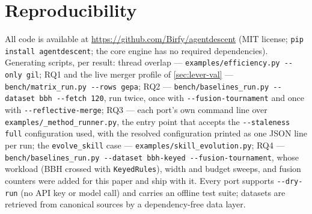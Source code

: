 \documentclass{article}
\newcommand{\code}[1]{\texttt{#1}}
\begin{document}
\section*{Reproducibility}
\label{sec:repro}
\sloppy
All code is available at \url{https://github.com/Birfy/agentdescent} (MIT license; \code{pip install agentdescent}; the core engine has no required dependencies). Generating scripts, per result: thread overlap --- \code{examples/efficiency.py -{}-only gil}; RQ1 and the live merger profile of \cref{sec:lever-val} --- \code{bench/matrix\_run.py -{}-rows gepa}; RQ2 --- \code{bench/baselines\_run.py -{}-dataset bbh -{}-fetch 120}, run twice, once with \code{-{}-fusion-tournament} and once with \code{-{}-reflective-merge}; RQ3 --- each port's own command line over \code{examples/\_method\_runner.py}, the entry point that accepts the \code{-{}-staleness full} configuration used, with the resolved configuration printed as one JSON line per run; the \code{evolve\_skill} case --- \code{examples/skill\_evolution.py}; RQ4 --- \code{bench/baselines\_run.py -{}-dataset bbh-keyed -{}-fusion-tournament}, whose workload (BBH crossed with \code{KeyedRules}), width and budget sweeps, and fusion counters were added for this paper and ship with it. Every port supports \code{-{}-dry-run} (no API key or model call) and carries an offline test suite; datasets are retrieved from canonical sources by a dependency-free data layer.



\end{document}
